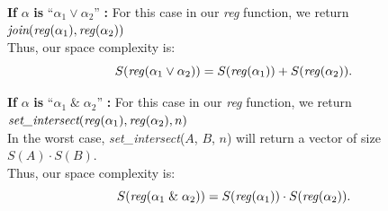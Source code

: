 \documentclass[runningheads]{llncs}
\begin{document}
\textbf{If} $\alpha$ \textbf{is} ``$\alpha_{1} \lor \alpha_{2}$'' \textbf{:}
    For this case in our \emph{reg} function, we return $\textit{join}(\text{\emph{reg}}(\alpha_{1}), \text{\emph{reg}}(\alpha_{2}))$ \\
    Thus, our space complexity is:
    \[
    S(\text{\emph{reg}}(\alpha_{1} \lor \alpha_{2})) = S(\text{\emph{reg}}(\alpha_{1})) + S(\text{\emph{reg}}(\alpha_{2})).
    \]
 

\textbf{If} $\alpha$ \textbf{is} ``$\alpha_{1} \; \& \; \alpha_{2}$'' \textbf{:}
    For this case in our \emph{reg} function, we return $ \textit{set\_intersect}(\text{\emph{reg}}(\alpha_{1}), \text{\emph{reg}}(\alpha_{2}), n)$ \\
    In the worst case, \textit{set\_intersect}($A$, $B$, $n$) will return a vector of size $S(A) \cdot S(B)$.\\
    Thus, our space complexity is:
    \[ 
    S(\text{\emph{reg}}(\alpha_{1} \; \& \; \alpha_{2})) = S(\text{\emph{reg}}(\alpha_{1})) \cdot S(\text{\emph{reg}}(\alpha_{2})).
    \]
\end{document}
